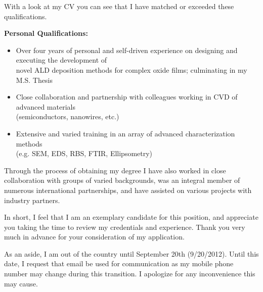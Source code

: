 \documentclass[10pt,letterpaper,sans]{moderncv}
\begin{document}
With a look at my CV you can see that I have matched or exceeded these qualifications.

\textbf{Personal Qualifications:}
\begin{itemize}
	\item Over four years of personal and self-driven experience on designing and executing the development of\\%
	novel ALD deposition methods for complex oxide films; culminating in my M.S. Thesis
	\item Close collaboration and partnership with colleagues working in CVD of advanced materials\\(semiconductors, nanowires, etc.)
	\item Extensive and varied training in an array of advanced characterization methods\\(e.g. SEM, EDS, RBS, FTIR, Ellipsometry)
\end{itemize}
\vspace{1.5em}

Through the process of obtaining my degree I have also worked in close collaboration with groups of varied backgrounds, was an integral member of numerous international partnerships, and have assisted on various projects with industry partners.

In short, I feel that I am an exemplary candidate for this position, and appreciate you taking the time to review my credentials and experience. Thank you very much in advance for your consideration of my application.

As an aside, I am out of the country until September 20th (9/20/2012). Until this date, I request that email be used for communication as my mobile phone number may change during this transition. I apologize for any inconvenience this may cause.

\makeletterclosing
\end{document}
